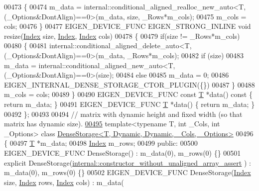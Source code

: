 \begin{DoxyCode}
00473     \{
00474       m\_data = internal::conditional\_aligned\_realloc\_new\_auto<T,(\_Options&DontAlign)==0>(m\_data, size, 
      \_Rows*m\_cols);
00475       m\_cols = cols;
00476     \}
00477     EIGEN\_DEVICE\_FUNC EIGEN\_STRONG\_INLINE \textcolor{keywordtype}{void} resize(\hyperlink{namespace_eigen_a62e77e0933482dafde8fe197d9a2cfde}{Index} size, \hyperlink{namespace_eigen_a62e77e0933482dafde8fe197d9a2cfde}{Index}, 
      \hyperlink{namespace_eigen_a62e77e0933482dafde8fe197d9a2cfde}{Index} cols)
00478     \{
00479       \textcolor{keywordflow}{if}(size != \_Rows*m\_cols)
00480       \{
00481         internal::conditional\_aligned\_delete\_auto<T,(\_Options&DontAlign)==0>(m\_data, \_Rows*m\_cols);
00482         \textcolor{keywordflow}{if} (size)
00483           m\_data = internal::conditional\_aligned\_new\_auto<T,(\_Options&DontAlign)==0>(size);
00484         \textcolor{keywordflow}{else}
00485           m\_data = 0;
00486         EIGEN\_INTERNAL\_DENSE\_STORAGE\_CTOR\_PLUGIN(\{\})
00487       \}
00488       m\_cols = cols;
00489     \}
00490     EIGEN\_DEVICE\_FUNC \textcolor{keyword}{const} \hyperlink{group___sparse_core___module}{T} *data()\textcolor{keyword}{ const }\{ \textcolor{keywordflow}{return} m\_data; \}
00491     EIGEN\_DEVICE\_FUNC \hyperlink{group___sparse_core___module}{T} *data() \{ \textcolor{keywordflow}{return} m\_data; \}
00492 \};
00493 
00494 \textcolor{comment}{// matrix with dynamic height and fixed width (so that matrix has dynamic size).}
\hyperlink{class_eigen_1_1_dense_storage_3_01_t_00_01_dynamic_00_01_dynamic_00_01___cols_00_01___options_01_4}{00495} \textcolor{keyword}{template}<\textcolor{keyword}{typename} T, \textcolor{keywordtype}{int} \_Cols, \textcolor{keywordtype}{int} \_Options> \textcolor{keyword}{class }
      \hyperlink{class_eigen_1_1_dense_storage_3_01_t_00_01_dynamic_00_01_dynamic_00_01___cols_00_01___options_01_4}{DenseStorage<T, Dynamic, Dynamic, \_Cols, \_Options>}
00496 \{
00497     \hyperlink{group___sparse_core___module}{T} *m\_data;
00498     \hyperlink{namespace_eigen_a62e77e0933482dafde8fe197d9a2cfde}{Index} m\_rows;
00499   \textcolor{keyword}{public}:
00500     EIGEN\_DEVICE\_FUNC DenseStorage() : m\_data(0), m\_rows(0) \{\}
00501     \textcolor{keyword}{explicit} DenseStorage(\hyperlink{struct_eigen_1_1internal_1_1constructor__without__unaligned__array__assert}{internal::constructor\_without\_unaligned\_array\_assert}
      ) : m\_data(0), m\_rows(0) \{\}
00502     EIGEN\_DEVICE\_FUNC DenseStorage(\hyperlink{namespace_eigen_a62e77e0933482dafde8fe197d9a2cfde}{Index} size, \hyperlink{namespace_eigen_a62e77e0933482dafde8fe197d9a2cfde}{Index} rows, \hyperlink{namespace_eigen_a62e77e0933482dafde8fe197d9a2cfde}{Index} cols) : m\_data(

\end{DoxyCode}
